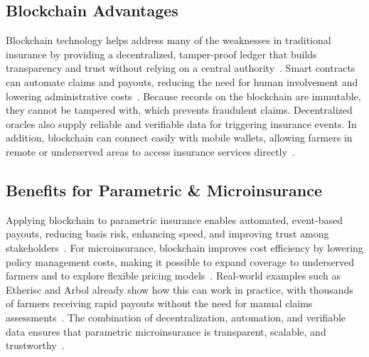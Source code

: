 \documentclass[11pt,a4paper]{article}
\begin{document}
		\subsection{Blockchain Advantages}\label{subsec:blockchain-advantages}
		Blockchain technology helps address many of the weaknesses in traditional insurance by providing a decentralized, tamper-proof ledger that builds transparency and trust without relying on a central authority~\parencite{Shetty2022}.
		Smart contracts can automate claims and payouts, reducing the need for human involvement and lowering administrative costs~\parencite{Chainlink2021, DominguezAnguianoParte2024}.
		Because records on the blockchain are immutable, they cannot be tampered with, which prevents fraudulent claims.
		Decentralized oracles also supply reliable and verifiable data for triggering insurance events.
		In addition, blockchain can connect easily with mobile wallets, allowing farmers in remote or underserved areas to access insurance services directly~\parencite{DominguezAnguianoParte2024}.

		\subsection{Benefits for Parametric \& Microinsurance}\label{subsec:benefits-for-parametric-&-microinsurance}
		Applying blockchain to parametric insurance enables automated, event-based payouts, reducing basis risk, enhancing speed, and improving trust among stakeholders~\parencite{Chainlink2021, ParametricInsured2025, Shetty2022}.
		For microinsurance, blockchain improves cost efficiency by lowering policy management costs, making it possible to expand coverage to underserved farmers and to explore flexible pricing models~\parencite{DominguezAnguianoParte2024, ResearchGate2023}.
		Real-world examples such as Etherisc and Arbol already show how this can work in practice, with thousands of farmers receiving rapid payouts without the need for manual claims assessments~\parencite{Alsdorf2024, DominguezAnguianoParte2024, ParametricInsured2025}.
		The combination of decentralization, automation, and verifiable data ensures that parametric microinsurance is transparent, scalable, and trustworthy~\parencite{Shetty2022}.
\end{document}
